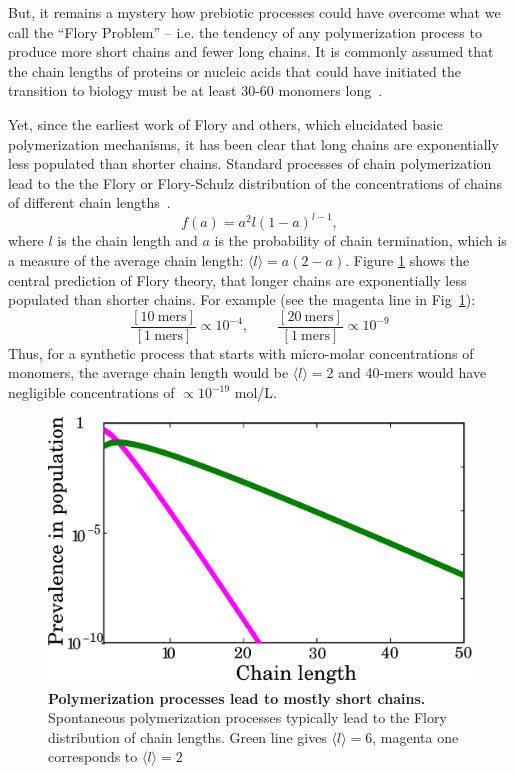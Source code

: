 \documentclass[journal=jacsat,manuscript=article,layout=twocolumn]{achemso}
\newcommand*{\pq}[1]{\left[ #1 \right]}
\begin{document}
 But, it remains a mystery how prebiotic processes could have overcome what we call the ``Flory 
Problem'' -- i.e. the tendency of any polymerization process to produce more short chains and fewer 
long chains.  It is commonly assumed that the chain lengths of proteins or nucleic acids that could 
have initiated the transition to biology must be at least 30-60 monomers long~\cite{Szostak1993}.  
 
 Yet, since the earliest work of Flory and others, which elucidated basic polymerization mechanisms, 
it has been clear that long chains are exponentially less populated than shorter chains.  Standard 
processes of chain polymerization lead to the the Flory or Flory-Schulz distribution of the 
concentrations of chains of different chain 
lengths~\cite{Flory1953}. 
\begin{equation}
 f(a)=a^2l(1-a)^{l-1},\label{eq:flory}
\end{equation} 
where $l$ is the chain length and $a$ is the probability of chain termination, 
which is a measure of the average chain length: $\langle l \rangle = a(2- a)$.
Figure \ref{fig:flory} shows the central prediction of Flory theory, that 
longer chains are exponentially less populated than shorter chains.  For example (see the magenta 
line 
in Fig~\ref{fig:flory}):
\begin{equation}  
\frac{\pq{10~\mathrm{mers}}}{\pq{1~\mathrm{mers}}}\propto10^{-4},\qquad\frac{\pq{20~\mathrm{mers}}}
{
\pq{1~\mathrm{mers}}}\propto10^{-9}
\end{equation} 
Thus, for a synthetic process that starts with micro-molar concentrations of monomers, the 
average chain length would be $\langle l \rangle = 2$ and 40-mers would have 
negligible concentrations of $\propto 10^{-19} $ mol/L. 
\begin{figure}[h!]
  \centering
  \includegraphics[width=\columnwidth]{pictures/flory2.pdf} 
  \caption{\textbf{Polymerization processes lead to mostly short chains.}  Spontaneous 
polymerization processes typically lead to the Flory distribution of chain lengths. 
Green line gives $\langle  l \rangle= 6$, magenta one corresponds to $\langle l \rangle=2$}
  \label{fig:flory}
\end{figure}
\end{document}

